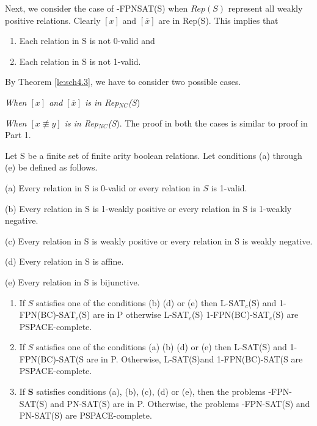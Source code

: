Next, we consider the case  of {-FPNSAT(S)} when $Rep(S)$ 
represent all weakly positive relations. 
Clearly $[x]$ and $[\overline{x}]$  are in {\sf Rep(S)}.
This implies that 
\begin{enumerate}
\item
Each relation in {\sf S} is not 0-valid and

\item
Each relation in {\sf S} is not 1-valid.
\end{enumerate}
By Theorem \ref{le:sch4.3}, we have to consider two possible cases.

\noindent
{\em When $[x]$ and $[\overline{x}]$ is in {\sf Rep}$_{NC}$({\sf S}})

\noindent
{\em When $[x \not\equiv y ]$  is in {\sf Rep}$_{NC}$({\sf S}}).
The proof in both the cases is similar to proof in Part 1.\QED







\begin{theorem}\label{th:hsat_charcterize4}
Let S be a finite set of finite arity boolean relations. Let conditions
(a) through (e) be defined as follows.

\begin{description}
\item{(a)}
Every relation in S is 0-valid or every relation in $S$ is 1-valid.
\item{(b)}
Every relation in S is 1-weakly positive or
every relation in S is 1-weakly negative.
\item{(c)}
Every relation in S is weakly positive or
every relation in S is weakly negative.
\item{(d)}
Every relation in S is affine.
\item{(e)}
Every relation in S is bijunctive.
\end{description}

\begin{enumerate}
\item
If $S$ satisfies one of the conditions (b) (d) or (e)
then L-SAT$_c$(S) and 1-FPN(BC)-SAT$_c$(S) are  in P otherwise
L-SAT$_c$(S) 1-FPN(BC)-SAT$_c$(S) are  PSPACE-complete.

\item
If $S$ satisfies one of the conditions (a) (b) (d) or (e)
then L-SAT(S) and 1-FPN(BC)-SAT(S are  in P. Otherwise, L-SAT(S)and 
1-FPN(BC)-SAT(S  are PSPACE-complete.


\item
If {\bf S} satisfies conditions (a), (b), (c), (d) or  (e), then the problems  
{-FPN-SAT(S)} and PN-SAT(S)  are in P. Otherwise, 
the problems  {-FPN-SAT(S)} and PN-SAT(S)  are  PSPACE-complete.

\end{enumerate}

\end{theorem}





